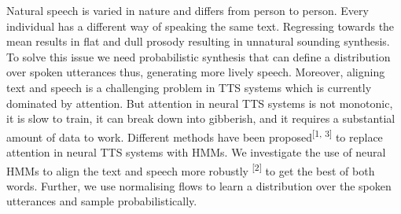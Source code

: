 \large
Natural speech is varied in nature and differs from person to person. Every individual has a different way of speaking the same text. Regressing towards the mean results in flat and dull prosody resulting in unnatural sounding synthesis. To solve this issue we need probabilistic synthesis that can define a distribution over spoken utterances thus, generating more lively speech. Moreover, aligning text and speech is a challenging problem in TTS systems which is currently dominated by attention. But attention in neural TTS systems is not monotonic, it is slow to train, it can break down into gibberish, and it requires a substantial amount of data to work. Different methods have been proposed\textsuperscript{[1, 3]} to replace attention in neural TTS systems with HMMs. We investigate the use of neural HMMs to align the text and speech more robustly \textsuperscript{[2]}
 to get the best of both words. Further, we use normalising flows to learn a distribution over the spoken utterances and sample probabilistically.
